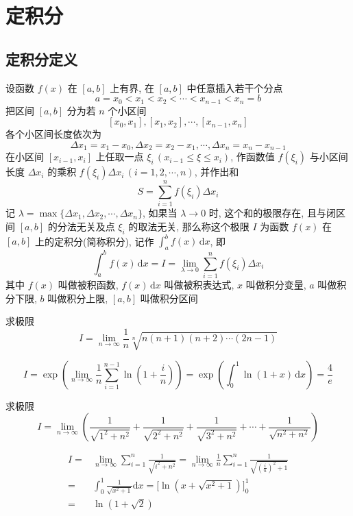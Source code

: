 \documentclass[color=green,titlestyle=hang]{elegantbook}%
\begin{document}
\section{定积分}
\subsection{定积分定义}

\begin{newdef}[定积分]
设函数 $f(x)$ 在 $[a,b]$ 上有界, 在 $[a,b]$ 中任意插入若干个分点\[a=x_0<x_1<x_2<\cdots<x_{n-1}<x_n=b\]
把区间 $[a,b]$ 分为若 $n$ 个小区间 \[[x_0,x_1],[x_1,x_2],\cdots,[x_{n-1},x_n]\]
各个小区间长度依次为\[\Delta x_1=x_1-x_0,\Delta x_2=x_2-x_1,\cdots,\Delta x_n=x_n-x_{n-1}\]
在小区间 $[x_{i-1},x_i]$ 上任取一点 $\xi_i$\,$(x_{i-1}\leqslant\xi\leqslant x_{i})$,  作函数值 $f(\xi_i)$ 与小区间长度 $\Delta x_i$ 的乘积 $f(\xi_i)\Delta x_i\,(i=1,2,\cdots,n)$, 并作出和
\[S=\sum_{i=1}^{n}f(\xi_i)\Delta x_i\]
记 $\lambda=\max\{\Delta x_1,\Delta x_2,\cdots,\Delta x_n\}$, 如果当 $\lambda\to0$ 时, 这个和的极限存在, 且与闭区间 $[a,b]$ 的分法无关及点 $\xi_i$ 的取法无关, 那么称这个极限 $I$ 为函数 $f(x)$ 在 $[a,b]$ 上的定积分(简称积分), 记作 $\int_a^bf(x)\,\mathrm{d}x$, 即\[\int_a^bf(x)\,\mathrm{d}x=I=\lim_{\lambda\to0}\sum_{i=1}^{n}f(\xi_i)\Delta x_i\]
其中 $f(x)$ 叫做被积函数, $f(x)\,\mathrm{d}x$ 叫做被积表达式, $x$ 叫做积分变量, $a$ 叫做积分下限, $b$ 叫做积分上限, $[a,b]$ 叫做积分区间	
\end{newdef}

\begin{exercise}求极限\begin{equation*}I=\lim_{n\to\infty}\frac{1}{n}\sqrt[n]{n(n+1)(n+2)\cdots(2n-1)}\end{equation*}
\end{exercise}\begin{Solution}
\[I=\exp\left(\lim_{n\to\infty}\frac{1}{n}\sum_{i=1}^{n-1}\ln\left(1+\frac{i}{n}\right)\right)=
\exp\left(\int_0^1\ln(1+x)\,\mathrm{d}x\right)=\frac{4}{e}\]	
\end{Solution}

\begin{exercise}求极限\begin{equation*}I=\lim_{n\to\infty}\left(\frac{1}{\sqrt{1^2+n^2}}+\frac{1}{\sqrt{2^2+n^2}}+\frac{1}{\sqrt{3^2+n^2}}+\cdots+\frac{1}{\sqrt{n^2+n^2}}\right)\end{equation*}
\end{exercise}\begin{Solution}
\begin{align*}I
=&\lim_{n\to\infty}\sum_{i=1}^{n}\frac{1}{\sqrt{i^2+n^2}}=\lim_{n\to\infty}\frac{1}{n}\sum_{i=1}^{n}\frac{1}{\sqrt{(\frac{i}{n})^2+1}}\\
=&\int_{0}^{1}\frac{1}{\sqrt{x^2+1}}\mathrm{d}x=\Big[\ln(x+\sqrt{x^2+1})\Big]_{0}^{1}\\
=&\ln(1+\sqrt{2})	
\end{align*}
\end{Solution}
\end{document}
